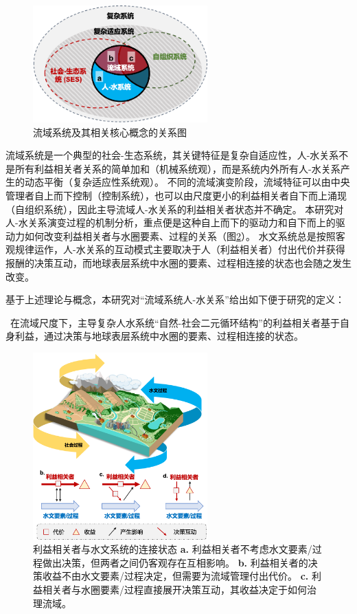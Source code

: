 \begin{figure}[htb] %
    \centering
    \includegraphics[width=0.6\textwidth]{img/ch2/ch2_concepts.png}
    \caption{流域系统及其相关核心概念的关系图}\label{ch2:fig:concepts}
\end{figure}

流域系统是一个典型的社会-生态系统，其关键特征是复杂自适应性，人-水关系不是所有利益相关者关系的简单加和（机械系统观），而是系统内外所有人-水关系产生的动态平衡（复杂适应性系统观）。
不同的流域演变阶段，流域特征可以由中央管理者自上而下控制（控制系统），也可以由尺度更小的利益相关者自下而上涌现（自组织系统），因此主导流域人-水关系的利益相关者状态并不确定。
本研究对人-水关系演变过程的机制分析，重点便是这种自上而下的驱动力和自下而上的驱动力如何改变利益相关者与水圈要素、过程的关系（图\ref{ch2:fig:interactions}）。
水文系统总是按照客观规律运作，人-水关系的互动模式主要取决于人（利益相关者）付出代价并获得报酬的决策互动，而地球表层系统中水圈的要素、过程相连接的状态也会随之发生改变。

基于上述理论与概念，本研究对“流域系统人-水关系”给出如下便于研究的定义：

{\kai~在流域尺度下，主导复杂人水系统“自然-社会二元循环结构”的利益相关者基于自身利益，通过决策与地球表层系统中水圈的要素、过程相连接的状态。}

\begin{figure}[htb]
    \centering
    \includegraphics[width=0.6\textwidth]{img/ch2/ch2_interactions.png}
    \caption[利益相关者与水文系统的连接状态]{利益相关者与水文系统的连接状态
        \textbf{a.} 利益相关者不考虑水文要素/过程做出决策，但两者之间仍客观存在互相影响。
        \textbf{b.} 利益相关者的决策收益不由水文要素/过程决定，但需要为流域管理付出代价。
        \textbf{c.} 利益相关者与水圈要素/过程直接展开决策互动，其收益决定于如何治理流域。
    }\label{ch2:fig:interactions}
\end{figure}
